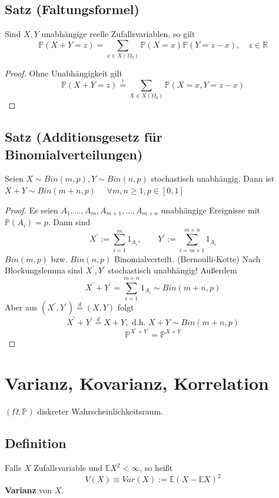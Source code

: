 \documentclass[a4paper,11pt,notitlepage]{report}
\newcommand{\R}{{\ensuremath{\mathbb{R}}}}
\newcommand{\Prim}{{\ensuremath{\mathbb{P}}}}
\newcommand{\E}{{\ensuremath{\mathbb{E}}}}
\begin{document}
\section{Satz (Faltungsformel)}
Sind $X,Y$ unabhängige reelle Zufallsvariablen, so gilt 
$$\Prim(X+Y = z) = \sum\limits_{x \in X(\Omega_0)}{\Prim(X=x) \Prim(Y=z-x)}, \quad z \in \R$$

\begin{proof}
	Ohne Unabhängigkeit gilt
	$$\Prim(X+Y=z) \overset{!}{=} \sum\limits_{X \in X(\Omega_0)}{\Prim(X=x, Y=z-x)}$$
\end{proof}

\section{Satz (Additionsgesetz für Binomialverteilungen)}
Seien $X \sim Bin(m,p), Y \sim Bin(n,p)$ stochastisch unabhängig. \newline
Dann ist $X+Y \sim Bin(m+n,p)$ $\quad \forall m,n \geq 1, p \in [0,1]$

\begin{proof}
	Es seien $A_1, \ldots, A_m, A_{m+1}, \ldots, A_{m+n}$ unabhängige Ereignisse mit $\Prim(A_i)=p$.
	Dann sind
	$$X^\prime := \sum\limits_{i=1}^m{1_{A_i}}, \qquad Y^\prime := \sum\limits_{i=m+1}^{m+n}{1_{A_i}}$$
	$Bin(m,p)$ bzw. $Bin(n,p)$ Binomialverteilt. (Bernoulli-Kette)
	\newline
	Nach Blockungslemma sind $X^\prime, Y^\prime$ stochastisch unabhängig!
	Außerdem
	$$X^\prime + Y^\prime = \sum\limits_{i=1}^{m+n}{1_{A_i}} \sim Bin(m+n,p)$$
	Aber aus $(X^\prime, Y^\prime) \overset{d}{=} (X,Y)$ folgt
	$$X^\prime + Y^\prime \overset{d}{=} X+Y, \text{ d.h. $X+Y \sim Bin(m+n,p)$}$$
	$$\Prim^{X^\prime + Y^\prime} = \Prim^{X+Y}$$
\end{proof}

\chapter{Varianz, Kovarianz, Korrelation}
$(\Omega, \Prim)$ diskreter Wahrscheinlichkeitsraum.

\section{Definition}
Falls $X$ Zufallsvariable und $\E X^2 < \infty$, so heißt
$$V(X)\equiv Var(X) := \E (X - \E X)^2$$
\textbf{Varianz} von $X$.
\end{document}
